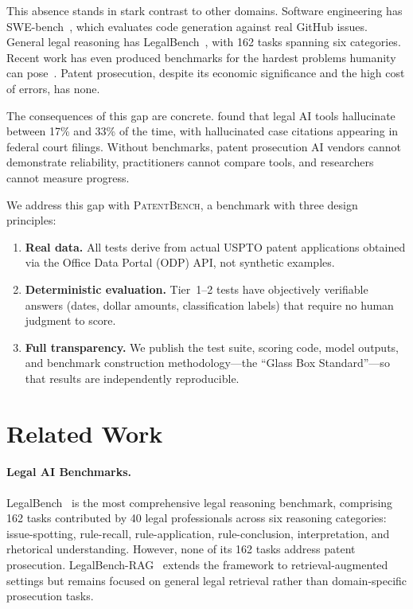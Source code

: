\documentclass[11pt]{article}
\begin{document}
This absence stands in stark contrast to other domains. Software engineering has SWE-bench~\citep{jimenez2023swebench}, which evaluates code generation against real GitHub issues. General legal reasoning has LegalBench~\citep{guha2023legalbench}, with 162 tasks spanning six categories. Recent work has even produced benchmarks for the hardest problems humanity can pose~\citep{phan2025humanitys}. Patent prosecution, despite its economic significance and the high cost of errors, has none.

The consequences of this gap are concrete. \citet{magesh2025hallucination} found that legal AI tools hallucinate between 17\% and 33\% of the time, with hallucinated case citations appearing in federal court filings. Without benchmarks, patent prosecution AI vendors cannot demonstrate reliability, practitioners cannot compare tools, and researchers cannot measure progress.

We address this gap with \textsc{PatentBench}, a benchmark with three design principles:
\begin{enumerate}[leftmargin=*]
    \item \textbf{Real data.} All tests derive from actual USPTO patent applications obtained via the Office Data Portal (ODP) API, not synthetic examples.
    \item \textbf{Deterministic evaluation.} Tier~1--2 tests have objectively verifiable answers (dates, dollar amounts, classification labels) that require no human judgment to score.
    \item \textbf{Full transparency.} We publish the test suite, scoring code, model outputs, and benchmark construction methodology---the ``Glass Box Standard''---so that results are independently reproducible.
\end{enumerate}

\section{Related Work}
\label{sec:related}

\paragraph{Legal AI Benchmarks.}
LegalBench~\citep{guha2023legalbench} is the most comprehensive legal reasoning benchmark, comprising 162 tasks contributed by 40 legal professionals across six reasoning categories: issue-spotting, rule-recall, rule-application, rule-conclusion, interpretation, and rhetorical understanding. However, none of its 162 tasks address patent prosecution. LegalBench-RAG~\citep{pipitone2024legalbenchrag} extends the framework to retrieval-augmented settings but remains focused on general legal retrieval rather than domain-specific prosecution tasks.
\end{document}
